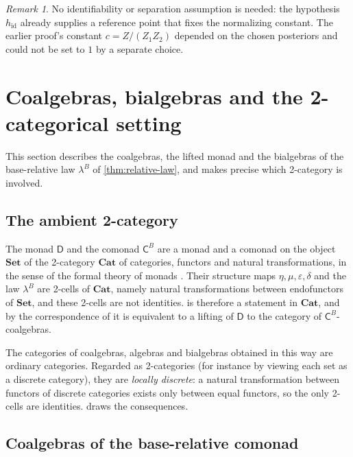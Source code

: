 \documentclass[11pt]{article}
\theoremstyle{definition}
\theoremstyle{remark}
\newtheorem{remark}[theorem]{Remark}
\newcommand{\D}{\mathsf{D}}
\newcommand{\Set}{\mathbf{Set}}
\newcommand{\C}{\mathsf{C}}
\newcommand{\hid}{h_{\mathrm{id}}}
\begin{document}
\begin{remark}
No identifiability or separation assumption is needed: the hypothesis $\hid$ already supplies a
reference point that fixes the normalizing constant. The earlier proof's constant
$c=Z/(Z_1Z_2)$ depended on the chosen posteriors and could not be set to $1$ by a separate choice.
\end{remark}

\section{Coalgebras, bialgebras and the 2-categorical setting}\label{sec:coalg}

This section describes the coalgebras, the lifted monad and the bialgebras of the base-relative law
$\lambda^B$ of \cref{thm:relative-law}, and makes precise which 2-category is involved.

\subsection{The ambient 2-category}\label{sec:ambient}

The monad $\D$ and the comonad $\C^B$ are a monad and a comonad on the object $\Set$ of the
2-category $\mathbf{Cat}$ of categories, functors and natural transformations, in the sense of the
formal theory of monads \cite{Street1972}. Their structure maps $\eta,\mu,\varepsilon,\delta$ and the
law $\lambda^B$ are 2-cells of $\mathbf{Cat}$, namely natural transformations between endofunctors of
$\Set$, and these 2-cells are not identities.  is therefore a statement in
$\mathbf{Cat}$, and by the correspondence of \cite{PowerWatanabe2002} it is equivalent to a lifting of
$\D$ to the category of $\C^B$-coalgebras.

The categories of coalgebras, algebras and bialgebras obtained in this way are ordinary categories.
Regarded as 2-categories (for instance by viewing each set as a discrete category), they are
\emph{locally discrete}: a natural transformation between functors of discrete categories exists only
between equal functors, so the only 2-cells are identities.  draws the consequences.

\subsection{Coalgebras of the base-relative comonad}
\end{document}
